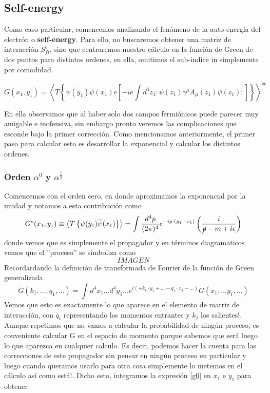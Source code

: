 \documentclass{article}
\numberwithin{equation}{section}
\begin{document}
\subsection{Self-energy}

Como caso particular, comencemos analizando el fenómeno de la auto-energía del electrón
o \textbf{self-energy}. Para ello, no buscaremos obtener una matriz
de interacción $S_{fi}^{c}$, sino que centraremos nuestro cálculo
en la función de Green de dos puntos para distintos ordenes, en ella,
omitimos el sub-indice in simplemente por comodidad.

\begin{equation}\label{qedgreen}
G(x_{1},y_{1})=\left\langle T\left\{ \psi(y_{1})\overline{\psi}(x_{1})e\left[-ie\int d^{4}z_{1}:\overline{\psi}(z_{1})\gamma^{\mu}A_{\mu}(z_{1})\psi(z_{1}):\right]\right\} \right\rangle ^{\#}
\end{equation}

En ella observamos que al haber solo dos campos fermiónicos puede
parecer muy amigable e inofensiva, sin embargo pronto veremos las complicaciones
que esconde bajo la primer corrección. Como mencionamos anteriormente,
el primer paso para calcular esto es desarrollar la exponencial y
calcular los distintos ordenes. 

\subsubsection*{Orden $\alpha^0$ y $\alpha^{\frac{1}{2}}$}

Comencemos con el orden cero, en donde
aproximamos la exponencial por la unidad y notamos a esta contribución
como 
\begin{equation}\label{g0}
G^{o}(x_{1},y_{1}) \equiv \left\langle T\left\{ \psi(y_{1})\overline{\psi}(x_{1})\right\} \right\rangle =\int\frac{d^{4}p}{(2\pi)^{4}}e^{-ip\cdot(y_{1}-x_{1})}\left(\frac{i}{\cancel{p}-m+i\epsilon}\right)
\end{equation}
donde vemos que es simplemente el propagador y en términos diagramaticos
vemos que el ''proceso'' se simboliza como
\begin{equation}
IMAGEN
\end{equation}
Recordardando la definición de transformada de Fourier de la función
de Green generalizada
\begin{equation}
\widetilde{G}(k_{1},...,q_{1},...)=\int d^{4}x_{1}...d^{4}y_{1}...e^{i(+k_{1}\cdot y_{1}+...-q_{1}\cdot x_{1}-...)}G(x_{1},...y_{1},...)
\end{equation}
Vemos que esto es exactamente lo que aparece en el elemento de matriz
de interacción, con $q_{i}$ representando los momentos entrantes
y $k_{j}$ los salientes!. Aunque repetimos que no vamos a calcular
la probabilidad de ningún proceso, es conveniente calcular G en el
espacio de momento porque sabemos que será luego lo que aparezca en
cualquier calculo. Es decir, podemos hacer la cuenta para las correcciones
de este propagador sin pensar en ningún proceso en particular y luego
cuando queramos usarlo para otra cosa simplemente lo metemos en el
cálculo así como está!. Dicho esto, integramos la expresión \ref{g0} en
$x_{1}$ e $y_{1}$ para obtener
\end{document}
